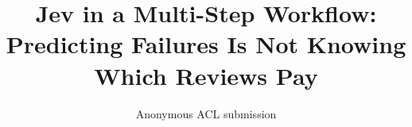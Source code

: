 \documentclass[11pt]{article}
\title{Jev in a Multi-Step Workflow:\\ Predicting Failures Is Not Knowing Which Reviews Pay}
\author{Anonymous ACL submission}
\begin{document}
\maketitle
\begin{abstract}

\end{abstract}





\appendix

\end{document}
